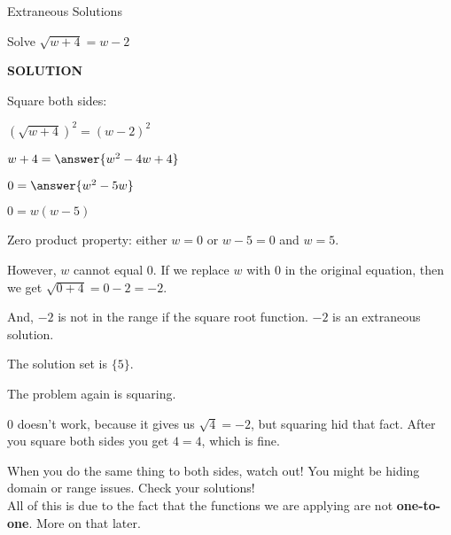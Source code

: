 \documentclass{ximera}
\begin{document}
\begin{example} Extraneous Solutions

Solve $\sqrt{w+4} = w - 2$


\textbf{\textcolor{purple!50!blue!90!black}{SOLUTION}}

Square both sides:



$(\sqrt{w+4})^2 = (w - 2)^2$


$w + 4 = \answer{w^2 - 4w + 4}$


$0 = \answer{w^2 - 5w}$

$0 = w(w-5) $


Zero product property:  either $w=0$ or $w-5=0$ and $w=5$.



However, $w$ cannot equal $0$.  If we replace $w$ with $0$ in the original equation, then we get $\sqrt{0+4} = 0 - 2 = -2$.

And, $-2$ is not in the range if the square root function. $-2$ is an extraneous solution.

The solution set is $\{ 5 \}$.



\end{example}


The problem again is squaring.

$0$ doesn't work, because it gives us $\sqrt{4} = -2$, but squaring hid that fact.  After you square both sides you get $4 = 4$, which is fine.





When you do the same thing to both sides, watch out!  You might be hiding domain or range issues.  Check your solutions! \\




All of this is due to the fact that the functions we are applying are not \textbf{one-to-one}.  More on that later.
\end{document}
